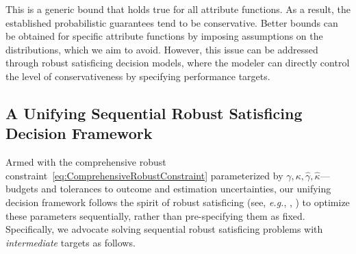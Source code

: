 \documentclass[mnsc, nonblindrev]{informswp}
\newcommand{\1}[1]{\mathds{1}{\left(#1\right)}}
\begin{document}
This is a generic bound that holds true for all attribute functions. As a result, the established probabilistic guarantees tend to be conservative. Better bounds can be obtained for specific attribute functions by imposing assumptions on the distributions, which we aim to avoid. However, this issue can be addressed through robust satisficing decision models, where the modeler can directly control the level of conservativeness by specifying performance targets.  

\subsection{A Unifying Sequential Robust Satisficing Decision Framework}
\label{sec:robust_satisficing_decision_framework}

Armed with the comprehensive robust constraint~\eqref{eq:ComprehensiveRobustConstraint} parameterized by $\gamma, \kappa, \hat \gamma, \hat \kappa$---budgets and tolerances to outcome and estimation uncertainties, our unifying decision framework follows the spirit of robust satisficing (see, \textit{e.g.}, \citealt{BenTal_et_al_2017globalized}, \citealt{Long_Sim_Zhou_2023robust}) to optimize these parameters sequentially, rather than pre-specifying them as fixed. Specifically, we advocate solving sequential robust satisficing problems with \textit{intermediate} targets as follows.
\end{document}
